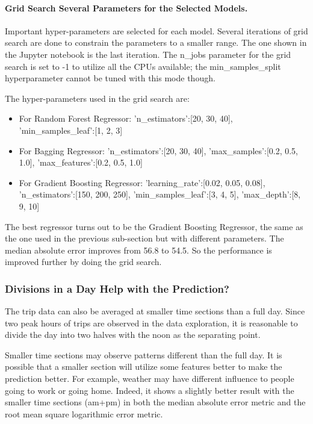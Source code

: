 \documentclass[a4paper]{article}
\begin{document}
				\paragraph{Grid Search Several Parameters for the Selected Models.}
				Important hyper-parameters are selected for each model. Several iterations of grid search are done to constrain the parameters to a smaller range. The one shown in the Jupyter notebook is the last iteration. The n\_jobs parameter for the grid search is set to -1 to utilize all the CPUs available; the min\_samples\_split hyperparameter cannot be tuned with this mode though. 
				
				The hyper-parameters used in the grid search are:
				
				\begin{itemize}
					\item For Random Forest Regressor: {'n\_estimators':[20, 30, 40], 'min\_samples\_leaf':[1, 2, 3]}
					\item For Bagging Regressor: {'n\_estimators':[20, 30, 40], 'max\_samples':[0.2, 0.5, 1.0], 'max\_features':[0.2, 0.5, 1.0]}
					\item For Gradient Boosting Regressor: {'learning\_rate':[0.02, 0.05, 0.08], 'n\_estimators':[150, 200, 250], 'min\_samples\_leaf':[3, 4, 5], 'max\_depth':[8, 9, 10]}
				\end{itemize}
				
				The best regressor turns out to be the Gradient Boosting Regressor, the same as the one used in the previous sub-section but with different parameters. The median absolute error improves from 56.8 to 54.5. So the performance is improved further by doing the grid search.
				
			\subsubsection{Divisions in a Day Help with the Prediction?}
			The trip data can also be averaged at smaller time sections than a full day. Since two peak hours of trips are observed in the data exploration, it is reasonable to divide the day into two halves with the noon as the separating point. 
			
			Smaller time sections may observe patterns different than the full day. It is possible that a smaller section will utilize some features better to make the prediction better. For example, weather may have different influence to people going to work or going home. Indeed, it shows a slightly better result with the smaller time sections (am+pm) in both the median absolute error metric and the root mean square logarithmic error metric. 
			
\end{document}
